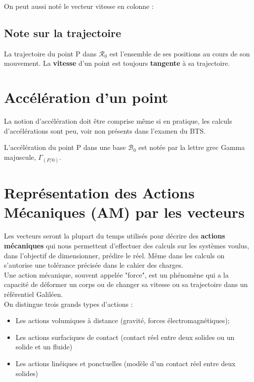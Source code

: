 \documentclass[
	11pt, %
	fleqn, %
	a4paper, %
]{LegrandOrangeBook}
\begin{document}
On peut aussi noté le vecteur vitesse en colonne :


\subsection*{Note sur la trajectoire}
La trajectoire du point P dans $\mathcal{R}_0$ est l’ensemble de ses positions au cours de son mouvement. La
\textbf{vitesse} d’un point est toujours \textbf{tangente} à sa trajectoire.


\section{Accélération d'un point}
La notion d'accélération doit être comprise même si en pratique, les calculs d'accélérations sont peu, voir non présents dans l'examen du BTS. 

L’accélération du point P dans une base $\mathcal{B}_0$ est notée par la lettre grec Gamma majuscule, $\Gamma_{(P/0)}$.





\section{Représentation des Actions Mécaniques (AM) par les vecteurs}

Les vecteurs seront la plupart du temps utilisés pour décrire des \textbf{actions mécaniques} qui nous permettent d'effectuer des calculs sur les systèmes voulus, dans l'objectif de dimensionner, prédire le réel. Même dans les calculs on s'autorise une tolérance précisée dans le cahier des charges. \\

Une action mécanique, souvent appelée "force", est un phénomène qui a la capacité de déformer un corps ou de changer sa vitesse ou sa trajectoire dans un référentiel Galiléen.\\

On distingue trois grands types d’actions :
\begin{itemize}
    \item Les actions volumiques à distance (gravité, forces électromagnétiques);
    \item Les actions surfaciques de contact (contact réel entre deux solides ou un solide et un fluide)
    \item Les actions linéiques et ponctuelles (modèle d’un contact réel entre deux solides)
\end{itemize}
\end{document}
